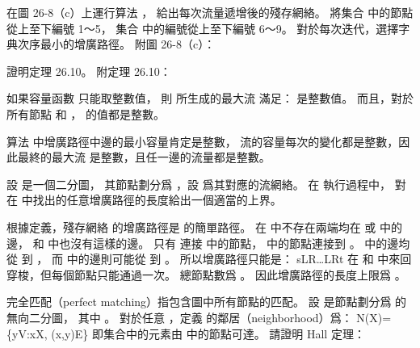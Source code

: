 \startsection[
  title={Maximum bipartite matching},
]

\startEXERCISE
在圖 26-8（c）上運行算法 ，
給出每次流量遞增後的殘存網絡。
將集合  中的節點從上至下編號 1～5，
集合  中的編號從上至下編號 6～9。
對於每次迭代，選擇字典次序最小的增廣路徑。
附圖 26-8（c）：

\externalfigure[output/e26_3_1-1]
\stopEXERCISE

\startANSWER
\startcombination[nx=4]
{\externalfigure[output/e26_3_1-2]}{}
{\externalfigure[output/e26_3_1-3]}{}
{\externalfigure[output/e26_3_1-4]}{}
{\externalfigure[output/e26_3_1-5]}{}
\stopcombination
\startcombination[nx=4]
{\externalfigure[output/e26_3_1-6]}{}
{\externalfigure[output/e26_3_1-7]}{}
{\externalfigure[output/e26_3_1-8]}{}
{}{}
\stopcombination
\stopANSWER

\startEXERCISE
證明定理 26.10。
附定理 26.10：

如果容量函數  只能取整數值，
則  所生成的最大流  滿足：  是整數值。
而且，對於所有節點  和 ，  的值都是整數。
\stopEXERCISE

\startANSWER
算法  中增廣路徑中邊的最小容量肯定是整數，
流的容量每次的變化都是整數，因此最終的最大流  是整數，且任一邊的流量都是整數。
\stopANSWER

\startEXERCISE
設  是一個二分圖，
其節點劃分爲 ，設  爲其對應的流網絡。
在  執行過程中，
對在  中找出的任意增廣路徑的長度給出一個適當的上界。
\stopEXERCISE

\startANSWER
根據定義，殘存網絡  的增廣路徑是  的簡單路徑。
在  中不存在兩端均在  或  中的邊，
  和  中也沒有這樣的邊。
只有  連接  中的節點，  中的節點連接到 。
  中的邊均從  到 ，
而  中的邊則可能從  到 。
所以增廣路徑只能是：
\startformula
s\rightarrow L\rightarrow R\rightarrow \ldots \rightarrow L\rightarrow R\rightarrow t
\stopformula
在  和  中來回穿梭，但每個節點只能通過一次。
總節點數爲 。
因此增廣路徑的長度上限爲 。
\stopANSWER

\startEXERCISE\DIFFICULT
{\EMP 完全匹配（perfect matching）}指包含圖中所有節點的匹配。
設  是節點劃分爲  的無向二分圖，
其中 。
對於任意 ，定義  的{\EMP 鄰居（neighborhood）}爲：
\startformula
N(X)=\{y\in V:\exists x\in X, (x,y)\in E\}
\stopformula
即集合中的元素由  中的節點可達。
請證明 Hall 定理：

